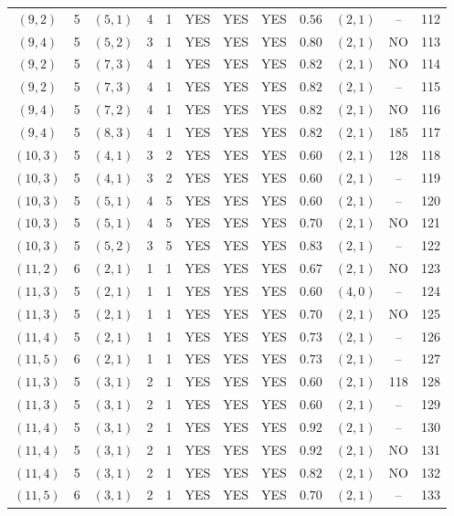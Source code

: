 \begin{longtable}{|c|c|c|c|c|c|c|c|c|c|c|c|}
$(9,2)$ & 5 & $(5,1)$ & 4 & 1 & YES & YES & YES & $0.56$ & $(2,1)$ & -- & 112\\
$(9,4)$ & 5 & $(5,2)$ & 3 & 1 & YES & YES & YES & $0.80$ & $(2,1)$ & NO & 113\\
$(9,2)$ & 5 & $(7,3)$ & 4 & 1 & YES & YES & YES & $0.82$ & $(2,1)$ & NO & 114\\
$(9,2)$ & 5 & $(7,3)$ & 4 & 1 & YES & YES & YES & $0.82$ & $(2,1)$ & -- & 115\\
$(9,4)$ & 5 & $(7,2)$ & 4 & 1 & YES & YES & YES & $0.82$ & $(2,1)$ & NO & 116\\
$(9,4)$ & 5 & $(8,3)$ & 4 & 1 & YES & YES & YES & $0.82$ & $(2,1)$ & 185 & 117\\
$(10,3)$ & 5 & $(4,1)$ & 3 & 2 & YES & YES & YES & $0.60$ & $(2,1)$ & 128 & 118\\
$(10,3)$ & 5 & $(4,1)$ & 3 & 2 & YES & YES & YES & $0.60$ & $(2,1)$ & -- & 119\\
$(10,3)$ & 5 & $(5,1)$ & 4 & 5 & YES & YES & YES & $0.60$ & $(2,1)$ & -- & 120\\
$(10,3)$ & 5 & $(5,1)$ & 4 & 5 & YES & YES & YES & $0.70$ & $(2,1)$ & NO & 121\\
$(10,3)$ & 5 & $(5,2)$ & 3 & 5 & YES & YES & YES & $0.83$ & $(2,1)$ & -- & 122\\
$(11,2)$ & 6 & $(2,1)$ & 1 & 1 & YES & YES & YES & $0.67$ & $(2,1)$ & NO & 123\\
$(11,3)$ & 5 & $(2,1)$ & 1 & 1 & YES & YES & YES & $0.60$ & $(4,0)$ & -- & 124\\
$(11,3)$ & 5 & $(2,1)$ & 1 & 1 & YES & YES & YES & $0.70$ & $(2,1)$ & NO & 125\\
$(11,4)$ & 5 & $(2,1)$ & 1 & 1 & YES & YES & YES & $0.73$ & $(2,1)$ & -- & 126\\
$(11,5)$ & 6 & $(2,1)$ & 1 & 1 & YES & YES & YES & $0.73$ & $(2,1)$ & -- & 127\\
$(11,3)$ & 5 & $(3,1)$ & 2 & 1 & YES & YES & YES & $0.60$ & $(2,1)$ & 118 & 128\\
$(11,3)$ & 5 & $(3,1)$ & 2 & 1 & YES & YES & YES & $0.60$ & $(2,1)$ & -- & 129\\
$(11,4)$ & 5 & $(3,1)$ & 2 & 1 & YES & YES & YES & $0.92$ & $(2,1)$ & -- & 130\\
$(11,4)$ & 5 & $(3,1)$ & 2 & 1 & YES & YES & YES & $0.92$ & $(2,1)$ & NO & 131\\
$(11,4)$ & 5 & $(3,1)$ & 2 & 1 & YES & YES & YES & $0.82$ & $(2,1)$ & NO & 132\\
$(11,5)$ & 6 & $(3,1)$ & 2 & 1 & YES & YES & YES & $0.70$ & $(2,1)$ & -- & 133\\

\end{longtable}

